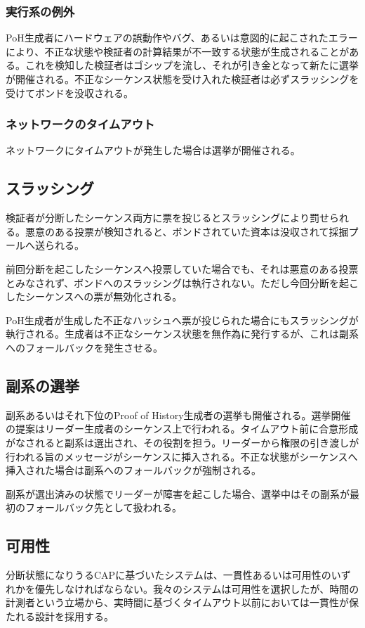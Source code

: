 \documentclass[12pt]{ltjsarticle}
\begin{document}
\subsubsection{実行系の例外}
PoH生成者にハードウェアの誤動作やバグ、あるいは意図的に起こされたエラーにより、不正な状態や検証者の計算結果が不一致する状態が生成されることがある。これを検知した検証者はゴシップを流し、それが引き金となって新たに選挙が開催される。不正なシーケンス状態を受け入れた検証者は必ずスラッシングを受けてボンドを没収される。

\subsubsection{ネットワークのタイムアウト}

ネットワークにタイムアウトが発生した場合は選挙が開催される。

\subsection{スラッシング}
検証者が分断したシーケンス両方に票を投じるとスラッシングにより罰せられる。悪意のある投票が検知されると、ボンドされていた資本は没収されて採掘プールへ送られる。

前回分断を起こしたシーケンスへ投票していた場合でも、それは悪意のある投票とみなされず、ボンドへのスラッシングは執行されない。ただし今回分断を起こしたシーケンスへの票が無効化される。

PoH生成者が生成した不正なハッシュへ票が投じられた場合にもスラッシングが執行される。生成者は不正なシーケンス状態を無作為に発行するが、これは副系へのフォールバックを発生させる。

\subsection{副系の選挙}
副系あるいはそれ下位のProof of History生成者の選挙も開催される。選挙開催の提案はリーダー生成者のシーケンス上で行われる。タイムアウト前に合意形成がなされると副系は選出され、その役割を担う。リーダーから権限の引き渡しが行われる旨のメッセージがシーケンスに挿入される。不正な状態がシーケンスへ挿入された場合は副系へのフォールバックが強制される。

副系が選出済みの状態でリーダーが障害を起こした場合、選挙中はその副系が最初のフォールバック先として扱われる。

\subsection{可用性}\label{availability}
分断状態になりうるCAPに基づいたシステムは、一貫性あるいは可用性のいずれかを優先しなければならない。我々のシステムは可用性を選択したが、時間の計測者という立場から、実時間に基づくタイムアウト以前においては一貫性が保たれる設計を採用する。
\end{document}
